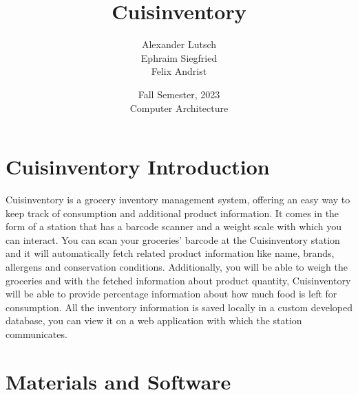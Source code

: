 \documentclass{article}
\author{Alexander Lutsch\\Ephraim Siegfried\\Felix Andrist}
\title{ \Huge Cuisinventory }
\date{Fall Semester, 2023 \\ Computer Architecture}
\begin{document}
\maketitle

\section{Cuisinventory Introduction}
Cuisinventory is a grocery inventory management system, offering an easy way to keep track of consumption and additional product information.
It comes in the form of a station that has a barcode scanner and a weight scale with which you can interact. You can scan your groceries' barcode at the Cuisinventory station and
it will automatically fetch related product information like name, brands, allergens and conservation conditions. Additionally, you will be able to weigh the groceries and with the fetched information about product quantity,
Cuisinventory will be able to provide percentage information about how much food is left for consumption. All the inventory information is saved locally in a custom developed database, you can view it on a web application with which the station communicates.

\section{Materials and Software}
\end{document}
